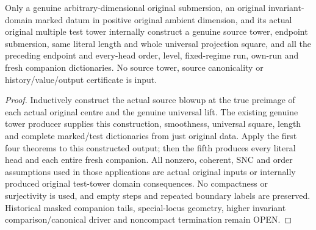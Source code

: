 \begin{theorem}
\label{hir:submersion-history-original-only}
\leanok
Only a genuine arbitrary-dimensional original submersion, an original
invariant-domain marked datum in positive original ambient dimension, and
its actual original multiple test tower internally construct a genuine
source tower, endpoint submersion, same literal length and whole universal
projection square, and all the preceding endpoint and every-head order,
level, fixed-regime run, own-run and fresh companion dictionaries. No
source tower, source canonicality or history/value/output certificate is
input.
\end{theorem}
\begin{proof}
Inductively construct the actual source blowup at the true preimage of each
actual original centre and the genuine universal lift. The existing genuine
tower producer supplies this construction, smoothness, universal square,
length and complete marked/test dictionaries from just original data. Apply
the first four theorems to this constructed output; then the fifth produces
every literal head and each entire fresh companion. All nonzero, coherent,
SNC and order assumptions used in those applications are actual original
inputs or internally produced original test-tower domain consequences. No
compactness or surjectivity is used, and empty steps and repeated boundary
labels are preserved. Historical masked companion tails, special-locus
geometry, higher invariant comparison/canonical driver and noncompact
termination remain OPEN.
\end{proof}

